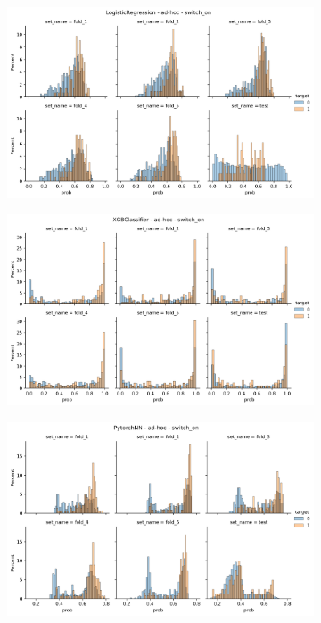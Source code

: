 \begin{figure}
    \centering
    \begin{subfigure}[b]{0.83\textwidth}
    \includegraphics[width=\linewidth]{figures/results/ad-hoc/lgr/switch_on/turn_to__distplot.png}
    \end{subfigure}
    \hfill
    \centering
    \begin{subfigure}[b]{0.83\textwidth}
        \centering
        \includegraphics[width=\linewidth]{figures/results/ad-hoc/xgb/switch_on/2021-12-07_06.56.08.418411__distplot.png}
    \end{subfigure}
    \hfill
    \centering
    \begin{subfigure}[b]{0.83\textwidth}
        \centering
        \includegraphics[width=\linewidth]{figures/results/ad-hoc/nn/switch_on/2021-12-06_18.44.35.478500__distplot.png}

\end{subfigure}
\end{figure}
